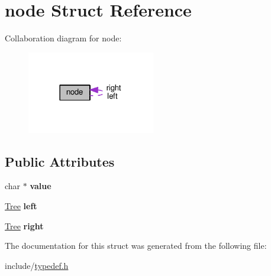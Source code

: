 \hypertarget{structnode}{}\section{node Struct Reference}
\label{structnode}


Collaboration diagram for node\+:
\nopagebreak
\begin{figure}[H]
\begin{center}
\leavevmode
\includegraphics[width=158pt]{structnode__coll__graph}
\end{center}
\end{figure}
\subsection*{Public Attributes}
\begin{DoxyCompactItemize}
\item 
char $\ast$ {\bfseries value}\hypertarget{structnode_a0d2c1eb2a9662a891bb09807232d7f9f}{}\label{structnode_a0d2c1eb2a9662a891bb09807232d7f9f}

\item 
\hyperlink{structnode}{Tree} {\bfseries left}\hypertarget{structnode_a8bb8b7799bf138f227ce9d05ba8d3ca4}{}\label{structnode_a8bb8b7799bf138f227ce9d05ba8d3ca4}

\item 
\hyperlink{structnode}{Tree} {\bfseries right}\hypertarget{structnode_ade8fc5b5eff73152fc0b9c5c6ca6f0dd}{}\label{structnode_ade8fc5b5eff73152fc0b9c5c6ca6f0dd}

\end{DoxyCompactItemize}


The documentation for this struct was generated from the following file\+:\begin{DoxyCompactItemize}
\item 
include/\hyperlink{typedef_8h}{typedef.\+h}\end{DoxyCompactItemize}
